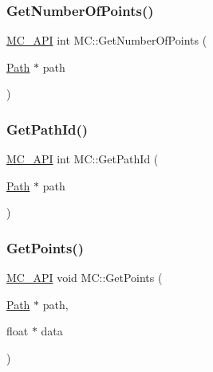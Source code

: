 \mbox{\label{namespace_m_c_a0d49c1635fffe3e7b53a9c07657f1159}} 
\subsubsection{\texorpdfstring{GetNumberOfPoints()}{GetNumberOfPoints()}}
{\footnotesize\ttfamily \mbox{\hyperlink{_mesh___creator___controller_8hpp_a529916b90fdb2765a7b955fded854b0a}{M\+C\+\_\+\+A\+PI}} int M\+C\+::\+Get\+Number\+Of\+Points (\begin{DoxyParamCaption}\item[{\mbox{\hyperlink{class_m_c_1_1_path}{Path}} $\ast$}]{path }\end{DoxyParamCaption})}

\mbox{\label{namespace_m_c_a348813330bb868b5e461155b80fbde14}} 
\subsubsection{\texorpdfstring{GetPathId()}{GetPathId()}}
{\footnotesize\ttfamily \mbox{\hyperlink{_mesh___creator___controller_8hpp_a529916b90fdb2765a7b955fded854b0a}{M\+C\+\_\+\+A\+PI}} int M\+C\+::\+Get\+Path\+Id (\begin{DoxyParamCaption}\item[{\mbox{\hyperlink{class_m_c_1_1_path}{Path}} $\ast$}]{path }\end{DoxyParamCaption})}

\mbox{\label{namespace_m_c_a6c0e195159f00355a9fe9331d67b2b4c}} 
\subsubsection{\texorpdfstring{GetPoints()}{GetPoints()}}
{\footnotesize\ttfamily \mbox{\hyperlink{_mesh___creator___controller_8hpp_a529916b90fdb2765a7b955fded854b0a}{M\+C\+\_\+\+A\+PI}} void M\+C\+::\+Get\+Points (\begin{DoxyParamCaption}\item[{\mbox{\hyperlink{class_m_c_1_1_path}{Path}} $\ast$}]{path,  }\item[{float $\ast$}]{data }\end{DoxyParamCaption})}

